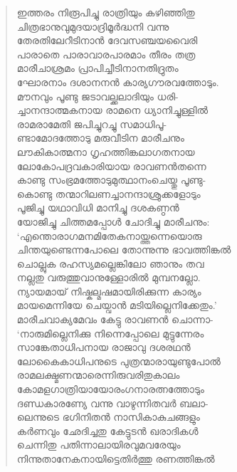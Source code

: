\begin{verse}
ഇത്തരം നിരൂപിച്ചു രാത്രിയും കഴിഞ്ഞിതു\\
ചിത്രഭാനുവുമുദയാദ്രിമൂര്‍ദ്ധനി വന്നു\\
തേരതിലേറീടിനാന്‍ ദേവസഞ്ചയവൈരി\\
പാരാതെ പാരാവാരപാരമാം തീരം തത്ര\\
മാരീചാശ്രമം പ്രാപിച്ചീടിനാനതിദ്രുതം\\
ഘോരനാം ദശാനനന്‍ കാര്യഗൗരവത്തോടും.\\
മൗനവും പൂണ്ടു ജടാവല്ക്കലാദിയും ധരി-\\
ച്ചാനന്ദാത്മകനായ രാമനെ ധ്യാനിച്ചുള്ളില്‍\\
രാമരാമേതി ജപിച്ചുറച്ചു സമാധിപൂ-\\
ണ്ടാമോദത്തോടു മരുവീടിന മാരീചനും\\
ലൗകികാത്മനാ ഗൃഹത്തിങ്കലാഗതനായ\\
ലോകോപദ്രവകാരിയായ രാവണന്‍തന്നെ\\
കാണ്ടു സംഭ്രമത്തോടുമുത്ഥാനംചെയ്തു പൂണ്ടു-\\
കൊണ്ടു തന്മാറിലണച്ചാനന്ദാശ്രുക്കളോടും\\
പൂജിച്ചു യഥാവിധി മാനിച്ചു ദശകണ്ഠന്‍\\
യോജിച്ചു ചിത്തമപ്പോള്‍ ചോദിച്ചു മാരീചനും:\\
‘എന്തൊരാഗമനമിതേകനായ്ത്തന്നെയൊരു\\
ചിന്തയുണ്ടെന്നപോലെ തോന്നുന്നു ഭാവത്തിങ്കല്‍\\
ചൊല്ലുക രഹസ്യമല്ലെങ്കിലോ ഞാനും തവ\\
നല്ലതു വരുത്തുവാനുള്ളോരില്‍ മുമ്പനല്ലോ.\\
ന്യായമായ് നിഷ്കല്മഷമായിരിക്കുന്ന കാര്യം\\
മായമെന്നിയേ ചെയ്വാന്‍ മടിയില്ലെനിക്കേതും.’\\
മാരീചവാക്യമേവം കേട്ടു രാവണന്‍ ചൊന്നാ-\\
‘നാരുമില്ലെനിക്കു നിന്നെപ്പോലെ മുട്ടുന്നേരം\\
സാങ്കേതാധിപനായ രാജാവു ദശരഥന്‍\\
ലോകൈകാധിപനുടെ പുത്രന്മാരായുണ്ടുപോല്‍\\
രാമലക്ഷ്മണന്മാരെന്നിരുവരിതുകാലം\\
കോമളഗാത്രിയായോരംഗനാരത്നത്തോടും\\
ദണ്ഡകാരണ്യേ വന്നു വാഴുന്നിതവര്‍ ബലാ-\\
ലെന്നുടെ ഭഗിനിതന്‍ നാസികാകുചങ്ങളും\\
കര്‍ണവും ഛേദിച്ചതു കേട്ടുടന്‍ ഖരാദികള്‍\\
ചെന്നിതു പതിന്നാലായിരവുമവരേയും\\
നിന്നുതാനേകനായിട്ടെതിര്‍ത്തു രണത്തിങ്കല്‍\\

\end{verse}
